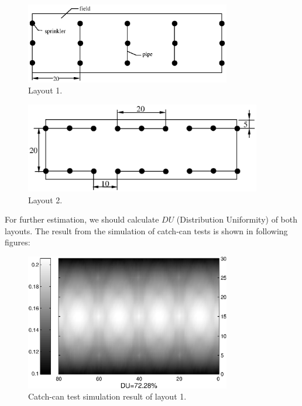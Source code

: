 \documentclass[12pt,a4paper,titlepage]{article}
\begin{document}
\begin{figure}[!htb]
\centering
\includegraphics[width=0.8\textwidth]{fig12.eps} \caption{\label{fig12} Layout 1. }
\end{figure}

\begin{figure}[!htb]
\centering
\includegraphics[width=0.92\textwidth]{fig13.eps} \caption{\label{fig13} Layout 2. }
\end{figure}

For further estimation, we should calculate $DU$ (Distribution
Uniformity) of both layouts. The result from the simulation of
catch-can tests is shown in following figures:

\newpage

\begin{figure}[!htb]
\centering
\includegraphics[width=0.8\textwidth]{fig14.eps} \caption{\label{fig14} Catch-can test simulation result of layout 1. }
\end{figure}
\end{document}
